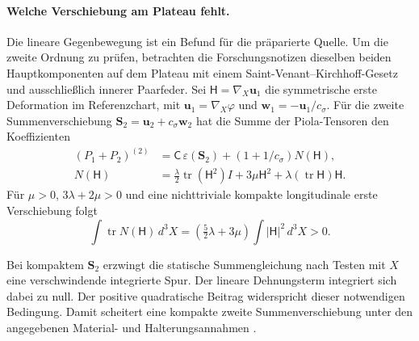 \paragraph{Welche Verschiebung am Plateau fehlt.}

Die lineare Gegenbewegung ist ein Befund für die präparierte Quelle. Um die zweite Ordnung zu prüfen, betrachten die Forschungsnotizen dieselben beiden Hauptkomponenten auf dem Plateau mit einem Saint-Venant--Kirchhoff-Gesetz und ausschließlich innerer Paarfeder. Sei \(\mathsf H=\nabla_X\mathbf u_1\) die symmetrische erste Deformation im Referenzchart, mit \(\mathbf u_1=\nabla_X\varphi\) und \(\mathbf w_1=-\mathbf u_1/c_\sigma\). Für die zweite Summenverschiebung \(\mathbf S_2=\mathbf u_2+c_\sigma\mathbf w_2\) hat die Summe der Piola-Tensoren den Koeffizienten
\begin{align}
 (P_1+P_2)^{(2)}&=\mathsf C\,\varepsilon(\mathbf S_2)
                     +(1+1/c_\sigma)N(\mathsf H),\\
 N(\mathsf H)&=\tfrac{\lambda}{2}\operatorname{tr}(\mathsf H^2)I
                 +3\mu\mathsf H^2+\lambda(\operatorname{tr}\mathsf H)\mathsf H .
\end{align}
Für \(\mu>0\), \(3\lambda+2\mu>0\) und eine nichttriviale kompakte longitudinale erste Verschiebung folgt
\begin{equation}
 \int\operatorname{tr}N(\mathsf H)\,d^3X
 =\left(\tfrac52\lambda+3\mu\right)\int|\mathsf H|^2\,d^3X>0 .
 \label{eq:op5-second}
\end{equation}

Bei kompaktem \(\mathbf S_2\) erzwingt die statische Summengleichung nach Testen mit \(X\) eine verschwindende integrierte Spur. Der lineare Dehnungsterm integriert sich dabei zu null. Der positive quadratische Beitrag widerspricht dieser notwendigen Bedingung. Damit scheitert eine kompakte zweite Summenverschiebung unter den angegebenen Material- und Halterungsannahmen \cite{op5-elastic-limit}.

